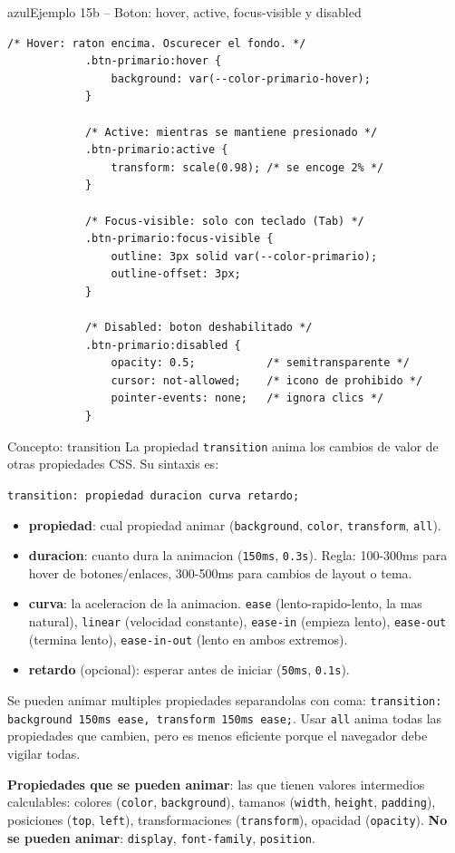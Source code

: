\documentclass[11pt,a4paper]{article}
\begin{document}
	\begin{cajacodigo}{azul}{Ejemplo 15b -- Boton: hover, active, focus-visible y disabled}
		\begin{lstlisting}[style=codecss]
			/* Hover: raton encima. Oscurecer el fondo. */
			.btn-primario:hover {
				background: var(--color-primario-hover);
			}
			
			/* Active: mientras se mantiene presionado */
			.btn-primario:active {
				transform: scale(0.98); /* se encoge 2% */
			}
			
			/* Focus-visible: solo con teclado (Tab) */
			.btn-primario:focus-visible {
				outline: 3px solid var(--color-primario);
				outline-offset: 3px;
			}
			
			/* Disabled: boton deshabilitado */
			.btn-primario:disabled {
				opacity: 0.5;           /* semitransparente */
				cursor: not-allowed;    /* icono de prohibido */
				pointer-events: none;   /* ignora clics */
			}
		\end{lstlisting}
	\end{cajacodigo}
	
	\begin{cajaconcepto}{Concepto: transition}
		La propiedad \texttt{transition} anima los cambios de valor de otras propiedades CSS. Su sintaxis es:
		
		\texttt{transition: propiedad duracion curva retardo;}
		
		\begin{itemize}[leftmargin=1.2em,itemsep=3pt]
			\item \textbf{propiedad}: cual propiedad animar (\texttt{background}, \texttt{color}, \texttt{transform}, \texttt{all}).
			\item \textbf{duracion}: cuanto dura la animacion (\texttt{150ms}, \texttt{0.3s}). Regla: 100-300ms para hover de botones/enlaces, 300-500ms para cambios de layout o tema.
			\item \textbf{curva}: la aceleracion de la animacion. \texttt{ease} (lento-rapido-lento, la mas natural), \texttt{linear} (velocidad constante), \texttt{ease-in} (empieza lento), \texttt{ease-out} (termina lento), \texttt{ease-in-out} (lento en ambos extremos).
			\item \textbf{retardo} (opcional): esperar antes de iniciar (\texttt{50ms}, \texttt{0.1s}).
		\end{itemize}
		
		Se pueden animar multiples propiedades separandolas con coma: \texttt{transition: background 150ms ease, transform 150ms ease;}. Usar \texttt{all} anima todas las propiedades que cambien, pero es menos eficiente porque el navegador debe vigilar todas.
		
		\textbf{Propiedades que se pueden animar}: las que tienen valores intermedios calculables: colores (\texttt{color}, \texttt{background}), tamanos (\texttt{width}, \texttt{height}, \texttt{padding}), posiciones (\texttt{top}, \texttt{left}), transformaciones (\texttt{transform}), opacidad (\texttt{opacity}). \textbf{No se pueden animar}: \texttt{display}, \texttt{font-family}, \texttt{position}.
	\end{cajaconcepto}
	
\end{document}
